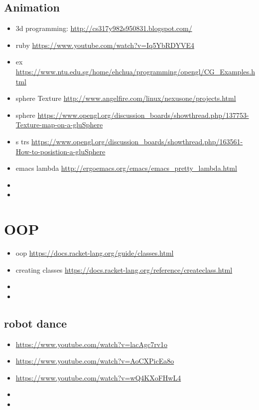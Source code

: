 \documentclass[9pt,b5paper]{article}
\begin{document}
\subsection{Animation}
\label{sec-2-2}
\begin{itemize}
\item 3d programming: \url{http://cs317y982s950831.blogspot.com/}
\item ruby \url{https://www.youtube.com/watch?v=Iq5YbRDYVE4}
\item ex \url{https://www.ntu.edu.sg/home/ehchua/programming/opengl/CG_Examples.html}
\item sphere Texture \url{http://www.angelfire.com/linux/nexusone/projects.html}
\item sphere \url{https://www.opengl.org/discussion_boards/showthread.php/137753-Texture-map-on-a-gluSphere}
\item s trs \url{https://www.opengl.org/discussion_boards/showthread.php/163561-How-to-posistion-a-gluSphere}
\item emacs lambda \url{http://ergoemacs.org/emacs/emacs_pretty_lambda.html}
\item 
\item 
\end{itemize}

\section{OOP}
\label{sec-3}
\begin{itemize}
\item oop \url{https://docs.racket-lang.org/guide/classes.html}
\item creating classes \url{https://docs.racket-lang.org/reference/createclass.html}
\item 
\item 
\end{itemize}

\subsection{robot dance}
\label{sec-3-1}
\begin{itemize}
\item \url{https://www.youtube.com/watch?v=lacAgc7rv1o}
\item \url{https://www.youtube.com/watch?v=AoCXPicEa8o}
\item \url{https://www.youtube.com/watch?v=wQ4KXoFHwL4}
\item 
\item 
\end{itemize}
\end{document}
